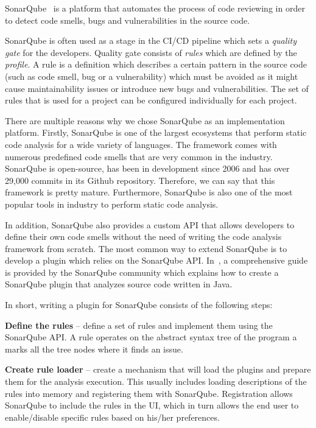 SonarQube~\cite{sonar} is a platform that automates the process of code reviewing in order to detect code smells,
bugs and vulnerabilities in the source code.

SonarQube is often used as a stage in the CI/CD pipeline which sets a \textit{quality gate} for the developers.
Quality gate consists of \textit{rules} which are defined by the \textit{profile}.
A rule is a definition which describes a certain pattern in the source code (such as code smell, bug or a vulnerability) which
must be avoided as it might cause maintainability issues or introduce new bugs and vulnerabilities.
The set of rules that is used for a project can be configured individually for each project.

There are multiple reasons why we chose SonarQube as an implementation platform.
Firstly, SonarQube is one of the largest ecosystems that perform static code analysis for a wide variety of languages.
The framework comes with numerous predefined code smells that are very common in the industry.
SonarQube is open-source, has been in development since 2006 and has over 29,000 commits in its Github repository\cite{sonar-repo}.
Therefore, we can say that this framework is pretty mature.
Furthermore, SonarQube is also one of the most popular tools in industry to perform static code analysis.

In addition, SonarQube also provides a custom API that allows developers to define their own code smells without
the need of writing the code analysis framework from scratch.
The most common way to extend SonarQube is to develop a plugin which relies on the SonarQube API\@.
In~\cite{sonar_plugin_tutorial}, a comprehensive guide is provided by the SonarQube community which explains how to create
a SonarQube plugin that analyzes source code written in Java.

In short, writing a plugin for SonarQube consists of the following steps:

\begin{flushleft}
    \textbf{Define the rules} -- define a set of rules and implement them using the SonarQube API\@.
    A rule operates on the abstract syntax tree of the program a marks all the tree nodes where it finds
    an issue.
\end{flushleft}

\begin{flushleft}
    \textbf{Create rule loader} -- create a mechanism that will load the plugins and prepare them for the analysis
    execution.
    This usually includes loading descriptions of the rules into memory and registering them with SonarQube.
    Registration allows SonarQube to include the rules in the UI, which in turn allows the end user to enable/disable
    specific rules based on his/her preferences.
\end{flushleft}


